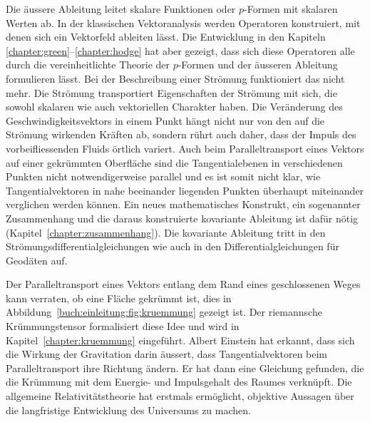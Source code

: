 Die äussere Ableitung leitet skalare Funktionen oder $p$-Formen
mit skalaren Werten ab.
In der klassischen Vektoranalysis werden Operatoren konstruiert,
mit denen sich ein Vektorfeld ableiten lässt.
Die Entwicklung in den Kapiteln \ref{chapter:green}--\ref{chapter:hodge}
hat aber gezeigt, dass sich diese Operatoren alle durch die
vereinheitlichte Theorie der $p$-Formen und der äusseren Ableitung
formulieren lässt.
Bei der Beschreibung einer Strömung funktioniert das nicht mehr.
Die Strömung transportiert Eigenschaften der Strömung mit sich,
die sowohl skalaren wie auch vektoriellen Charakter haben.
Die Veränderung des Geschwindigkeitsvektors in einem Punkt hängt
nicht nur von den auf die Strömung wirkenden Kräften ab, sondern
rührt auch daher, dass der Impuls des vorbeifliessenden Fluids
örtlich variert.
Auch beim Paralleltransport eines Vektors auf einer gekrümmten
%
Oberfläche sind die Tangentialebenen in verschiedenen Punkten nicht
notwendigerweise parallel und es ist somit nicht klar, wie
Tangentialvektoren in nahe beeinander liegenden Punkten überhaupt
miteinander verglichen werden können.
Ein neues mathematisches Konstrukt, ein sogenannter Zusammenhang
%
und die daraus konstruierte kovariante Ableitung ist dafür nötig
(Kapitel~\ref{chapter:zusammenhang}).
Die kovariante Ableitung tritt in den Strömungsdifferentialgleichungen
%
%
wie auch in den Differentialgleichungen für Geodäten auf.
%

Der Paralleltransport eines Vektors entlang dem Rand eines
geschlossenen Weges kann verraten, ob eine Fläche gekrümmt ist, 
dies in Abbildung~\ref{buch:einleitung:fig:kruemmung} gezeigt ist.
%
Der riemannsche Krümmungstensor formalisiert diese Idee und wird
%
in Kapitel~\ref{chapter:kruemmung} eingeführt.
Albert Einstein hat erkannt, dass sich die Wirkung der Gravitation
%
darin äussert, dass Tangentialvektoren beim Paralleltransport 
ihre Richtung ändern.
Er hat dann eine Gleichung gefunden, die die Krümmung mit dem
Energie- und Impulsgehalt des Raumes verknüpft.
Die allgemeine Relativitätstheorie hat erstmals ermöglicht,
%
%
objektive Aussagen über die langfristige Entwicklung des
Universums zu machen.

